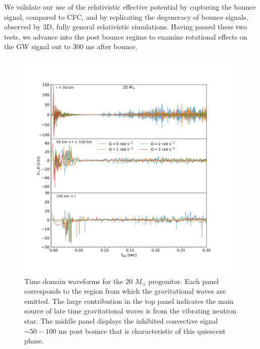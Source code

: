 \documentclass[twocolumn,times]{aastex62}  %
\begin{document}
We validate our use of the relativistic effective potential by capturing the bounce signal, compared to CFC, and by replicating the degeneracy of bounce signals, observed by 3D, fully general relativistic simulations.  Having passed these two tests, we advance into the post bounce regime to examine rotational effects on the GW signal out to 300 ms after bounce.


\begin{figure}[htp]
  \centering     %
  \includegraphics[width=\textwidth]{figures/tdwf_region_20.png}
  \caption{Time domain waveforms for the 20 $M_\odot$ progenitor.  Each panel corresponds to the region from which the gravitational waves are emitted.  The large contribution in the top panel indicates the main source of late time gravitational waves is from the vibrating neutron star.  The middle panel displays the inhibited convective signal $\sim 50-100 $ ms post bounce that is characteristic of this quiescent phase.}
  \label{fig:region}
\end{figure}
\end{document}
